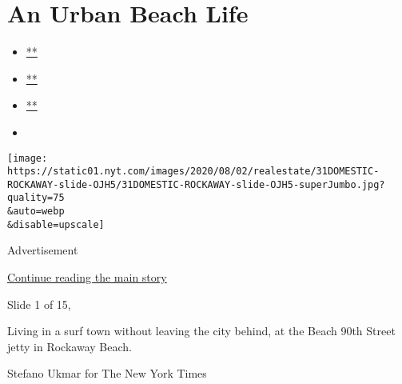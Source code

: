 \hypertarget{an-urban-beach-life}{%
\section{An Urban Beach Life}\label{an-urban-beach-life}}

\begin{itemize}
\item
  \href{https://www.facebook.com/sharer.php?app_id=9869919170\&u=https\%3A\%2F\%2Fwww.nytimes.com\%2Fslideshow\%2F2020\%2F07\%2F31\%2Frealestate\%2Fan-urban-beach-life.html\%3Fsmid\%3Dfb-share\&name=An\%20Urban\%20Beach\%20Life\&redirect_uri=https\%3A\%2F\%2Fwww.facebook.com\%2F}{**}
\item
  \href{https://twitter.com/intent/tweet?url=https\%3A\%2F\%2Fwww.nytimes.com\%2Fslideshow\%2F2020\%2F07\%2F31\%2Frealestate\%2Fan-urban-beach-life.html\%3Fsmid\%3Dtw-share\&text=An\%20Urban\%20Beach\%20Life}{**}
\item
  \href{mailto:?subject=NYTimes.com\%3A\%20An\%20Urban\%20Beach\%20Life\&body=From\%20The\%20New\%20York\%20Times\%3A\%0A\%0AAn\%20Urban\%20Beach\%20Life\%0A\%0ARockaway\%20Beach\%20has\%20a\%20land\%E2\%80\%99s-end\%20bacchanalian\%20spirit\%2C\%20but\%20it\%20also\%20feels\%20like\%20a\%20small\%20town.\%0A\%0Ahttps\%3A\%2F\%2Fwww.nytimes.com\%2Fslideshow\%2F2020\%2F07\%2F31\%2Frealestate\%2Fan-urban-beach-life.html\%3Fsmid\%3Dem-share}{**}
\item
\end{itemize}

\texttt{[image: https://static01.nyt.com/images/2020/08/02/realestate/31DOMESTIC-ROCKAWAY-slide-OJH5/31DOMESTIC-ROCKAWAY-slide-OJH5-superJumbo.jpg?quality=75\\\&auto=webp\\\&disable=upscale]}

Advertisement

\protect\hyperlink{after-right-0}{Continue reading the main story}

Slide 1 of 15,

Living in a surf town without leaving the city behind, at the Beach 90th
Street jetty in Rockaway Beach.

Stefano Ukmar for The New York Times

